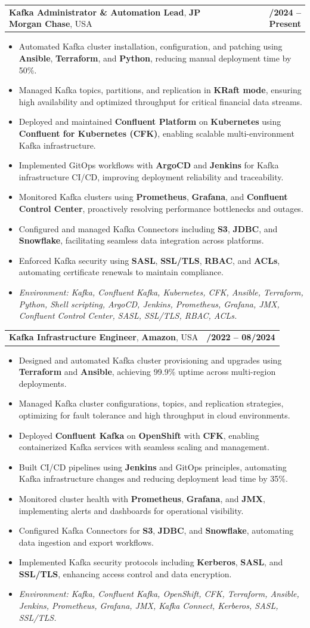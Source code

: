 \documentclass[letterpaper,11pt]{article}
\makeatletter
\newcommand{\resumeItem}[1]{
  \item\footnotesize{
    {#1 \vspace{-2pt}}
  }
}
\newcommand{\resumeSubheading}[4]{
  \vspace{-2pt}\item
    \begin{tabular*}{1.0\textwidth}[t]{l@{\extracolsep{\fill}}r}
      \textbf{\fontsize{10pt}{14pt}\selectfont #3}, \textbf{\fontsize{10pt}{14pt}\selectfont #1}, \fontsize{10pt}{14pt}\selectfont #4 & \textbf{\fontsize{10pt}{14pt}\selectfont #2} \\
    \end{tabular*}\vspace{-7pt}
}
\newcommand{\resumeItemListStart}{\begin{itemize}[leftmargin=*]}
\newcommand{\resumeItemListEnd}{\end{itemize}\vspace{-5pt}}
\makeatother
\begin{document}
\resumeSubheading
{JP Morgan Chase}{09/2024 -- Present}
{Kafka Administrator \& Automation Lead}{USA}
\resumeItemListStart
  \resumeItem{Automated Kafka cluster installation, configuration, and patching using \textbf{Ansible}, \textbf{Terraform}, and \textbf{Python}, reducing manual deployment time by 50\%.}
  \resumeItem{Managed Kafka topics, partitions, and replication in \textbf{KRaft mode}, ensuring high availability and optimized throughput for critical financial data streams.}
  \resumeItem{Deployed and maintained \textbf{Confluent Platform} on \textbf{Kubernetes} using \textbf{Confluent for Kubernetes (CFK)}, enabling scalable multi-environment Kafka infrastructure.}
  \resumeItem{Implemented GitOps workflows with \textbf{ArgoCD} and \textbf{Jenkins} for Kafka infrastructure CI/CD, improving deployment reliability and traceability.}
  \resumeItem{Monitored Kafka clusters using \textbf{Prometheus}, \textbf{Grafana}, and \textbf{Confluent Control Center}, proactively resolving performance bottlenecks and outages.}
  \resumeItem{Configured and managed Kafka Connectors including \textbf{S3}, \textbf{JDBC}, and \textbf{Snowflake}, facilitating seamless data integration across platforms.}
  \resumeItem{Enforced Kafka security using \textbf{SASL}, \textbf{SSL/TLS}, \textbf{RBAC}, and \textbf{ACLs}, automating certificate renewals to maintain compliance.}
  \resumeItem{\textit{Environment: Kafka, Confluent Kafka, Kubernetes, CFK, Ansible, Terraform, Python, Shell scripting, ArgoCD, Jenkins, Prometheus, Grafana, JMX, Confluent Control Center, SASL, SSL/TLS, RBAC, ACLs.}}
\resumeItemListEnd

\resumeSubheading
{Amazon}{10/2022 -- 08/2024}
{Kafka Infrastructure Engineer}{USA}
\resumeItemListStart
  \resumeItem{Designed and automated Kafka cluster provisioning and upgrades using \textbf{Terraform} and \textbf{Ansible}, achieving 99.9\% uptime across multi-region deployments.}
  \resumeItem{Managed Kafka cluster configurations, topics, and replication strategies, optimizing for fault tolerance and high throughput in cloud environments.}
  \resumeItem{Deployed \textbf{Confluent Kafka} on \textbf{OpenShift} with \textbf{CFK}, enabling containerized Kafka services with seamless scaling and management.}
  \resumeItem{Built CI/CD pipelines using \textbf{Jenkins} and GitOps principles, automating Kafka infrastructure changes and reducing deployment lead time by 35\%.}
  \resumeItem{Monitored cluster health with \textbf{Prometheus}, \textbf{Grafana}, and \textbf{JMX}, implementing alerts and dashboards for operational visibility.}
  \resumeItem{Configured Kafka Connectors for \textbf{S3}, \textbf{JDBC}, and \textbf{Snowflake}, automating data ingestion and export workflows.}
  \resumeItem{Implemented Kafka security protocols including \textbf{Kerberos}, \textbf{SASL}, and \textbf{SSL/TLS}, enhancing access control and data encryption.}
  \resumeItem{\textit{Environment: Kafka, Confluent Kafka, OpenShift, CFK, Terraform, Ansible, Jenkins, Prometheus, Grafana, JMX, Kafka Connect, Kerberos, SASL, SSL/TLS.}}
\resumeItemListEnd
\end{document}
